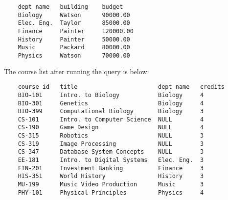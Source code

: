 \documentclass[letterpaper]{article}
\begin{document}
    \begin{lstlisting}
    dept_name	building	budget	
    Biology	    Watson	    90000.00
    Elec. Eng.	Taylor	    85000.00
    Finance	    Painter     120000.00
    History	    Painter     50000.00
    Music	    Packard     80000.00
    Physics	    Watson	    70000.00
    \end{lstlisting}
    The course list after running the query is below:
    \begin{lstlisting}
    course_id	title	                    dept_name	credits	
    BIO-101	    Intro. to Biology	        Biology	    4
    BIO-301	    Genetics	                Biology	    4
    BIO-399	    Computational Biology	    Biology	    3
    CS-101	    Intro. to Computer Science  NULL        4	
    CS-190	    Game Design                 NULL        4	
    CS-315	    Robotics                    NULL        3	
    CS-319	    Image Processing            NULL        3	
    CS-347	    Database System Concepts    NULL        3
    EE-181	    Intro. to Digital Systems	Elec. Eng.	3	
    FIN-201	    Investment Banking	        Finance	    3
    HIS-351	    World History	            History	    3
    MU-199	    Music Video Production	    Music	    3
    PHY-101	    Physical Principles	        Physics	    4      
    \end{lstlisting}
\end{document}
